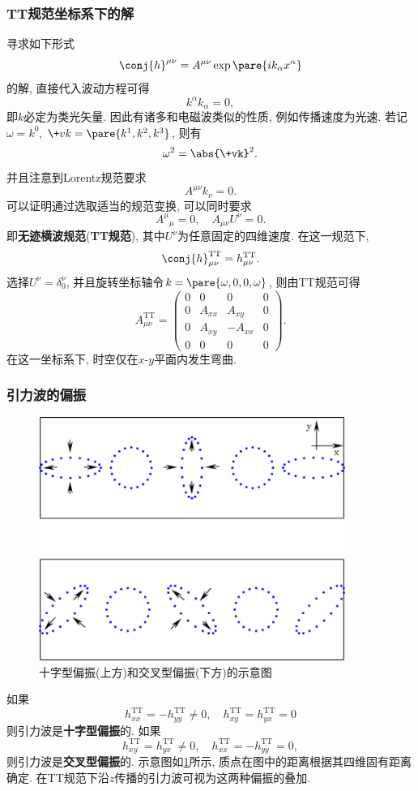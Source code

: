 \documentclass[hidelinks]{ctexart}
\begin{document}
\subsubsection{TT规范坐标系下的解} %
\label{ssub:tt规范坐标系下的解}

寻求如下形式
\[ \conj{h}^{\mu\nu} = A^{\mu\nu} \exp\pare{ik_\alpha x^\alpha} \]
的解, 直接代入波动方程可得
\[ k^\alpha k_\alpha = 0, \]
即$k$必定为类光矢量. 因此有诸多和电磁波类似的性质, 例如传播速度为光速. 若记$\omega = k^0$, $\+vk = \pare{k^1,k^2,k^3}$, 则有
\[ \omega^2 = \abs{\+vk}^2. \]
并且注意到Lorentz规范要求
\[ A^{\mu\nu}k_\nu = 0. \]
可以证明通过选取适当的规范变换, 可以同时要求\cite{Schutz2009}
\[ {A^\mu}_\mu = 0,\quad A_{\mu\nu} U^\nu = 0. \]
即\textbf{无迹横波规范}(\textbf{TT规范}), 其中$U^\nu$为任意固定的四维速度. 在这一规范下,
\[ \conj{h}_{\mu\nu}^{\mathrm{TT}} = {h}_{\mu\nu}^{\mathrm{TT}}. \]
选择$U^\nu = \delta^\nu_0$, 并且旋转坐标轴令$k = \pare{\omega,0,0,\omega}$, 则由TT规范可得
\[ \boxed{A_{\mu\nu}^{\mathrm{TT}} = \begin{pmatrix}
    0 & 0 & 0 & 0 \\
    0 & A_{xx} & A_{xy} & 0 \\
    0 & A_{xy} & -A_{xx} & 0 \\
    0 & 0 & 0 & 0
\end{pmatrix}.} \]
在这一坐标系下, 时空仅在$x$-$y$平面内发生弯曲.


\subsubsection{引力波的偏振} %
\label{ssub:引力波的偏振}

\begin{figure}[ht]
    \centering
    \includegraphics[width=10cm]{src/The-effect-of-a-passing-gravitational-wave-on-a-ring-of-freely-falling-test-particles.png}
    \caption{十字型偏振(上方)和交叉型偏振(下方)的示意图\cite{HGPM}}
    \label{fig:引力波偏振的示意图}
\end{figure}
如果
\[ h^{\mathrm{TT}}_{xx} = -h^{\mathrm{TT}}_{yy} \neq 0,\quad h^{\mathrm{TT}}_{xy} = h^{\mathrm{TT}}_{yx} = 0 \]
则引力波是\textbf{十字型偏振}的. 如果
\[ h^{\mathrm{TT}}_{xy} = h^{\mathrm{TT}}_{yx} \neq 0,\quad h^{\mathrm{TT}}_{xx} = -h^{\mathrm{TT}}_{yy} = 0, \]
则引力波是\textbf{交叉型偏振}的. 示意图如\cref{fig:引力波偏振的示意图}所示, 质点在图中的距离根据其四维固有距离确定. 在TT规范下沿$z$传播的引力波可视为这两种偏振的叠加.
\end{document}
